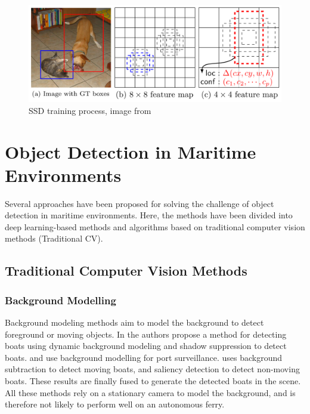 \begin{figure}[h!]
    \centering
    \includegraphics[width=0.9 \textwidth]{images/ssd_train.png}
    \caption{SSD training process, image from \citep{SSD}}
    \label{fig:ssd_training}
\end{figure}

\newpage

\section{Object Detection in Maritime Environments}
\label{sec:obj_det}

Several approaches have been proposed for solving the challenge of object detection in maritime environments. Here, the methods have been divided into deep learning-based methods and algorithms based on traditional computer vision methods (Traditional CV). 

\subsection{Traditional Computer Vision Methods}

\subsubsection{Background Modelling}
Background modeling methods aim to model the background to detect foreground or moving objects. In \citep{BackgroundWaveletSubstract} the authors propose a method for detecting boats using dynamic background modeling and shadow suppression to detect boats. \citep{SeeCoast} and \citep{Pires2010} use background modelling for port surveillance. \citep{Tran2016} uses background subtraction to detect moving boats, and saliency detection to detect non-moving boats. These results are finally fused to generate the detected boats in the scene. All these methods rely on a stationary camera to model the background, and is therefore not likely to perform well on an autonomous ferry.

